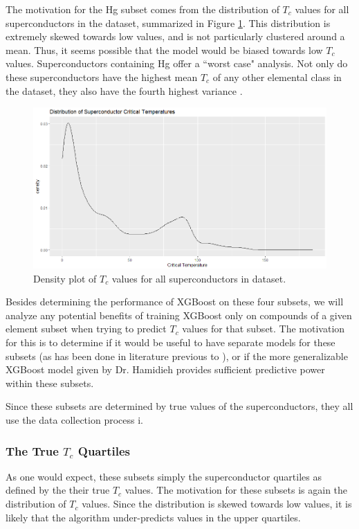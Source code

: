 \documentclass[oneside,12pt]{amsart}
\begin{document}
 The motivation for the Hg subset comes from the distribution of $T_c$ values for all superconductors in the dataset, summarized in Figure \ref{fig:Tc_density}. This distribution is extremely skewed towards low values, and is not particularly clustered around a mean. Thus, it seems possible that the model would be biased towards low $T_c$ values. Superconductors containing Hg offer a ``worst case" analysis. Not only do these superconductors have the highest mean $T_c$ of any other elemental class in the dataset, they also have the fourth highest variance \cite{hamidieh_data-driven_2018}. 
 
 \begin{figure}
     \centering
     \includegraphics[width=\linewidth]{Tc_dist.png}
     \caption{Density plot of $T_c$ values for all superconductors in dataset.}
     \label{fig:Tc_density}
 \end{figure}
 
 Besides determining the performance of XGBoost on these four subsets, we will analyze any potential benefits of training XGBoost only on compounds of a given element subset when trying to predict $T_c$ values for that subset. The motivation for this is to determine if it would be useful to have separate models for these subsets (as has been done in literature previous to \cite{hamidieh_data-driven_2018}), or if the more generalizable XGBoost model given by Dr. Hamidieh provides sufficient predictive power within these subsets.
 
 Since these subsets are determined by true values of the superconductors, they all use the data collection process i.
 
 \subsubsection{The True $T_c$ Quartiles}
 As one would expect, these subsets simply the superconductor quartiles as defined by the their true $T_c$ values. The motivation for these subsets is again the distribution of $T_c$ values. Since the distribution is skewed towards low values, it is likely that the algorithm under-predicts values in the upper quartiles. 
 
\end{document}
